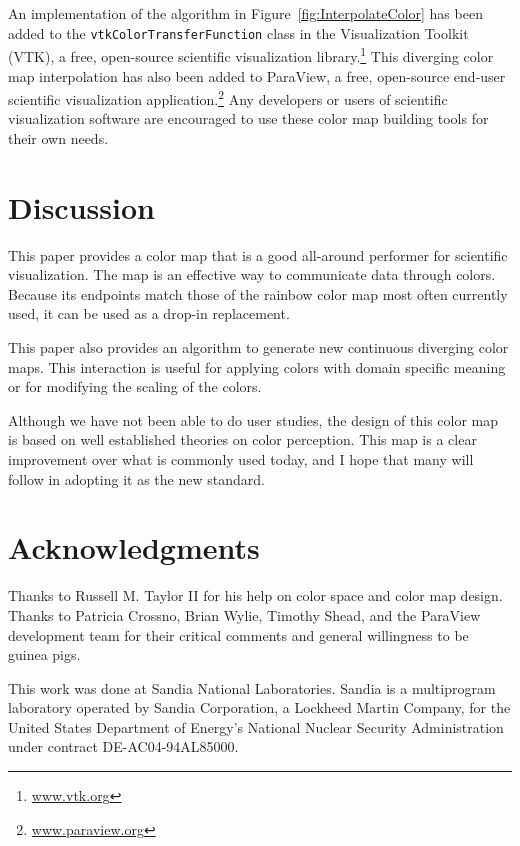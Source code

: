 \documentclass{acmsiggraph}               %
\begin{document}
An implementation of the  algorithm in
Figure~\ref{fig:InterpolateColor} has been added to the
\texttt{vtkColorTransferFunction} class in the Visualization Toolkit (VTK),
a free, open-source scientific visualization
library.\footnote{\href{http://www.vtk.org}{www.vtk.org}} This diverging
color map interpolation has also been added to ParaView, a free, open-source
end-user scientific visualization
application.\footnote{\href{http://www.paraview.org}{www.paraview.org}}
Any developers or users of scientific visualization software are encouraged
to use these color map building tools for their own needs.


\section{Discussion}
\label{sec:Discussion}

This paper provides a color map that is a good all-around performer for
scientific visualization.  The map is an effective way to communicate data
through colors.  Because its endpoints match those of the rainbow
color map most often currently used, it can be used as a drop-in
replacement.

This paper also provides an algorithm to generate new continuous diverging
color maps.  This interaction is useful for applying colors with domain
specific meaning or for modifying the scaling of the colors.

Although we have not been able to do user studies, the design of this color
map is based on well established theories on color perception.  This map is
a clear improvement over what is commonly used today, and I hope that many
will follow in adopting it as the new standard.


\section*{Acknowledgments}

Thanks to Russell M. Taylor II for his help on color space and color map
design.  Thanks to Patricia Crossno, Brian Wylie, Timothy Shead, and the
ParaView development team for their critical comments and general
willingness to be guinea pigs.

This work was done at Sandia National Laboratories.  Sandia is a
multiprogram laboratory operated by Sandia Corporation, a Lockheed Martin
Company, for the United States Department of Energy's National Nuclear
Security Administration under contract DE-AC04-94AL85000.




\end{document}
